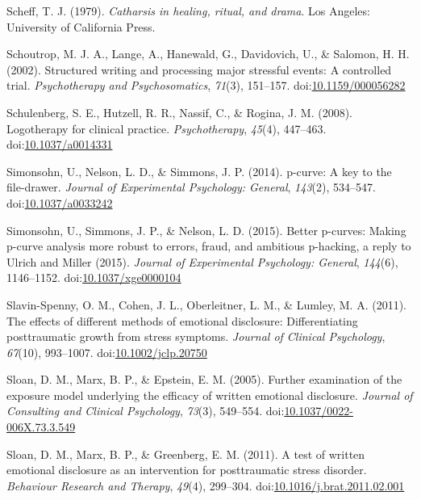 \documentclass[man, mask]{apa6}
\theoremstyle{definition}
\theoremstyle{definition}
\theoremstyle{definition}
\theoremstyle{remark}
\begin{document}
\hypertarget{ref-Scheff1979}{}
Scheff, T. J. (1979). \emph{Catharsis in healing, ritual, and drama}.
Los Angeles: University of California Press.

\hypertarget{ref-Schoutrop2002}{}
Schoutrop, M. J. A., Lange, A., Hanewald, G., Davidovich, U., \&
Salomon, H. H. (2002). Structured writing and processing major stressful
events: A controlled trial. \emph{Psychotherapy and Psychosomatics},
\emph{71}(3), 151--157.
doi:\href{https://doi.org/10.1159/000056282}{10.1159/000056282}

\hypertarget{ref-Schulenberg2008}{}
Schulenberg, S. E., Hutzell, R. R., Nassif, C., \& Rogina, J. M. (2008).
Logotherapy for clinical practice. \emph{Psychotherapy}, \emph{45}(4),
447--463. doi:\href{https://doi.org/10.1037/a0014331}{10.1037/a0014331}

\hypertarget{ref-Simonsohn2014}{}
Simonsohn, U., Nelson, L. D., \& Simmons, J. P. (2014). p-curve: A key
to the file-drawer. \emph{Journal of Experimental Psychology: General},
\emph{143}(2), 534--547.
doi:\href{https://doi.org/10.1037/a0033242}{10.1037/a0033242}

\hypertarget{ref-Simonsohn2015}{}
Simonsohn, U., Simmons, J. P., \& Nelson, L. D. (2015). Better p-curves:
Making p-curve analysis more robust to errors, fraud, and ambitious
p-hacking, a reply to Ulrich and Miller (2015). \emph{Journal of
Experimental Psychology: General}, \emph{144}(6), 1146--1152.
doi:\href{https://doi.org/10.1037/xge0000104}{10.1037/xge0000104}

\hypertarget{ref-Slavin-Spenny2011}{}
Slavin-Spenny, O. M., Cohen, J. L., Oberleitner, L. M., \& Lumley, M. A.
(2011). The effects of different methods of emotional disclosure:
Differentiating posttraumatic growth from stress symptoms. \emph{Journal
of Clinical Psychology}, \emph{67}(10), 993--1007.
doi:\href{https://doi.org/10.1002/jclp.20750}{10.1002/jclp.20750}

\hypertarget{ref-Sloan2005}{}
Sloan, D. M., Marx, B. P., \& Epstein, E. M. (2005). Further examination
of the exposure model underlying the efficacy of written emotional
disclosure. \emph{Journal of Consulting and Clinical Psychology},
\emph{73}(3), 549--554.
doi:\href{https://doi.org/10.1037/0022-006X.73.3.549}{10.1037/0022-006X.73.3.549}

\hypertarget{ref-Sloan2011a}{}
Sloan, D. M., Marx, B. P., \& Greenberg, E. M. (2011). A test of written
emotional disclosure as an intervention for posttraumatic stress
disorder. \emph{Behaviour Research and Therapy}, \emph{49}(4), 299--304.
doi:\href{https://doi.org/10.1016/j.brat.2011.02.001}{10.1016/j.brat.2011.02.001}
\end{document}
